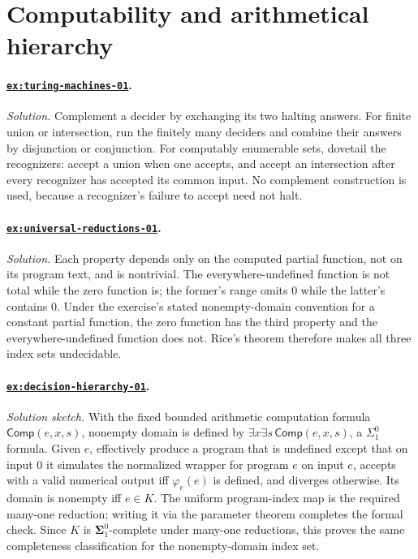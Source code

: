 \documentclass[11pt,oneside,openany]{book}
\theoremstyle{definition}
\theoremstyle{plain}
\theoremstyle{remark}
\begin{document}
\section{Computability and arithmetical hierarchy}

\paragraph{\hyperref[ex:turing-machines-01]{\texttt{ex:turing-machines-01}}.}
\textit{Solution.}  Complement a decider by exchanging its two halting answers.
For finite union or intersection, run the finitely many deciders and combine
their answers by disjunction or conjunction.  For computably enumerable sets,
dovetail the recognizers: accept a union when one accepts, and accept an
intersection after every recognizer has accepted its common input.  No
complement construction is used, because a recognizer's failure to accept need
not halt.

\paragraph{\hyperref[ex:universal-reductions-01]{\texttt{ex:universal-reductions-01}}.}
\textit{Solution.}  Each property depends only on the computed partial
function, not on its program text, and is nontrivial.  The everywhere-undefined
function is not total while the zero function is; the former's range omits
\(0\) while the latter's contains \(0\).  Under the exercise's stated
nonempty-domain convention for a constant partial function, the zero function
has the third property and the everywhere-undefined function does not.  Rice's
theorem therefore makes all three index sets undecidable.

\paragraph{\hyperref[ex:decision-hierarchy-01]{\texttt{ex:decision-hierarchy-01}}.}
\textit{Solution sketch.}  With the fixed bounded arithmetic computation
formula \(\mathsf{Comp}(e,x,s)\), nonempty domain is defined by
\(\exists x\exists s\,\mathsf{Comp}(e,x,s)\), a \(\Sigma^0_1\) formula.  Given \(e\),
effectively produce a program that is undefined except that on input \(0\) it
simulates the normalized wrapper for program \(e\) on input \(e\), accepts
with a valid numerical output iff \(\varphi_e(e)\) is defined, and diverges
otherwise.
Its domain is nonempty iff \(e\in K\).  The uniform program-index map
is the required many-one reduction; writing it via the parameter theorem
completes the formal check.  Since \(K\) is
\(\boldsymbol{\Sigma}^0_1\)-complete under many-one reductions, this proves
the same completeness classification for the nonempty-domain index set.
\end{document}
